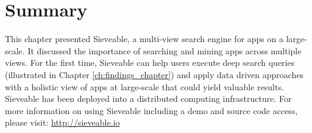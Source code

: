 \section{Summary}
This chapter presented Sieveable, a multi-view search engine for apps on a large-scale.
It discussed the importance of searching and mining apps across multiple views.
For the first time, Sieveable can help users execute deep search queries (illustrated in Chapter \ref{ch:findings_chapter}) and apply data driven approaches with a holistic view of apps at large-scale that could yield valuable results.
Sieveable has been deployed into a distributed computing infrastructure.
For more information on using Sieveable including a demo and source code access, please visit:
\url{http://sieveable.io}
